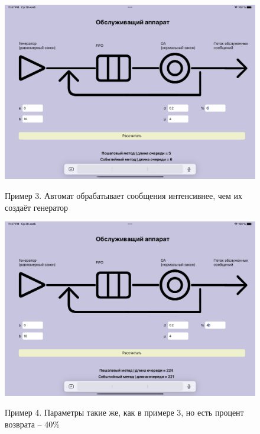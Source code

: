\begin{figure}[h!]
	\begin{center}
		{\includegraphics[scale = 0.15]{img/ex3.png}}
		\caption{Пример 3. Автомат обрабатывает сообщения интенсивнее, чем их создаёт генератор}
		\label{fig3:image}
	\end{center}
\end{figure}
\newpage

\begin{figure}[h!]
	\begin{center}
		{\includegraphics[scale = 0.15]{img/ex4.png}}
		\caption{Пример 4. Параметры такие же, как в примере 3, но есть процент возврата -- 40\%}
		\label{fig4:image}
	\end{center}
\end{figure}

